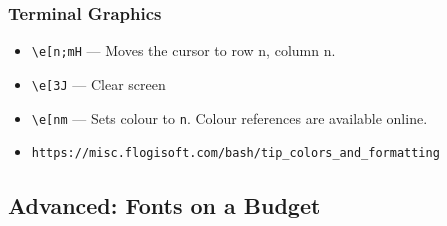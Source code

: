 \documentclass[handout,xcolor]{beamer}
\begin{document}
\begin{frame}
	\frametitle{Terminal Graphics}
	\pause
	
	\begin{itemize}
		\item \texttt{\textbackslash{}e[n;mH} --- Moves the cursor to row n, column n.
		\pause
		
		\item \texttt{\textbackslash{}e[3J} --- Clear screen
		\pause
		
		\item \texttt{\textbackslash{}e[nm} --- Sets colour to \texttt{n}. Colour references are available online.
		\pause
		
		\item \texttt{https://misc.flogisoft.com/bash/tip\_colors\_and\_formatting}
	\end{itemize}
\end{frame}

\subsection{Advanced: Fonts on a Budget}
\end{document}
